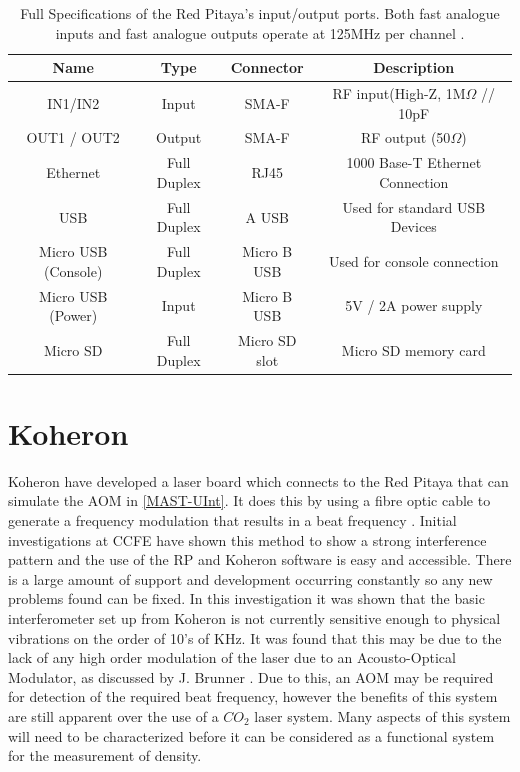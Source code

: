 \documentclass[12pt,a4paper,oneside]{report}
\begin{document}
\begin{table}[H]
	\setlength\arrayrulewidth{1pt}
    \begin{tabular}{ c c c c } 
        Name & Type & Connector & Description\\
        \hline
        IN1/IN2 & Input & SMA-F & RF input(High-Z, 1M$\Omega$ // 10pF\\[1pt]
        OUT1 / OUT2 & Output & SMA-F & RF output (50$\Omega$)\\[1pt]
        Ethernet & Full Duplex & RJ45 & 1000 Base-T Ethernet Connection\\[1pt]
        USB & Full Duplex & A USB & Used for standard USB Devices\\[1pt]
        Micro USB (Console) & Full Duplex & Micro B USB & Used for console connection\\[1pt]
        Micro USB (Power) & Input & Micro B USB & 5V / 2A power supply\\[1pt]
        Micro SD & Full Duplex & Micro SD slot & Micro SD memory card\\
    \end{tabular}
    \caption{Full Specifications of the Red Pitaya's input/output ports. Both fast analogue inputs and fast analogue outputs operate at 125MHz per channel \cite[p.~7]{Leban2014RedManual}.}
    \label{RPspec}
\end{table}

\section{Koheron}
Koheron have developed a laser board which connects to the Red Pitaya that can simulate the AOM in \autoref{MAST-UInt}. It does this by using a fibre optic cable to generate a frequency modulation that results in a beat frequency \cite{KoheronAmplitudeKoheron}. Initial investigations at CCFE \cite{Hickling2017InvestigationMAST-U} have shown this method to show a strong interference pattern and the use of the RP and Koheron software is easy and accessible. There is a large amount of support and development occurring constantly so any new problems found can be fixed. In this investigation it was shown that the basic interferometer set up from Koheron is not currently sensitive enough to physical vibrations on the order of 10's of KHz. It was found that this may be due to the lack of any high order modulation of the laser due to an Acousto-Optical Modulator, as discussed by J. Brunner \cite[p. ~29]{Brunner2017}. Due to this, an AOM may be required for detection of the required beat frequency, however the benefits of this system are still apparent over the use of a $CO_{2}$ laser system. Many aspects of this system will need to be characterized before it can be considered as a functional system for the measurement of density.
\end{document}
